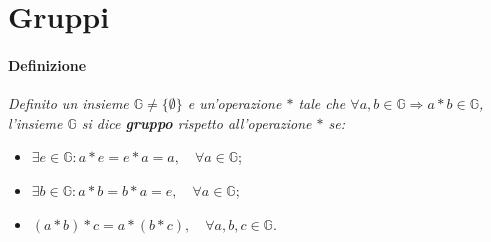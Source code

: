\documentclass[a4paper]{report}
\begin{document}
\section{Gruppi}
\paragraph{Definizione} \textit{Definito un insieme $\mathbb{G} \neq \{\emptyset\}$ e un'operazione $*$ tale che $\forall a,b \in \mathbb{G}\Rightarrow a*b\in \mathbb{G}$, l'insieme $\mathbb{G}$ si dice \textbf{gruppo} rispetto all'operazione $*$ se:}
\begin{itemize}
\item $\exists e \in \mathbb{G}: a*e=e*a=a,\quad \forall a \in \mathbb{G}$;
\item $\exists b \in \mathbb{G}: a*b=b*a=e,\quad \forall a \in \mathbb{G}$;
\item $(a*b)*c = a*(b*c), \quad \forall a,b,c \in \mathbb{G}$.
\end{itemize}
\end{document}
